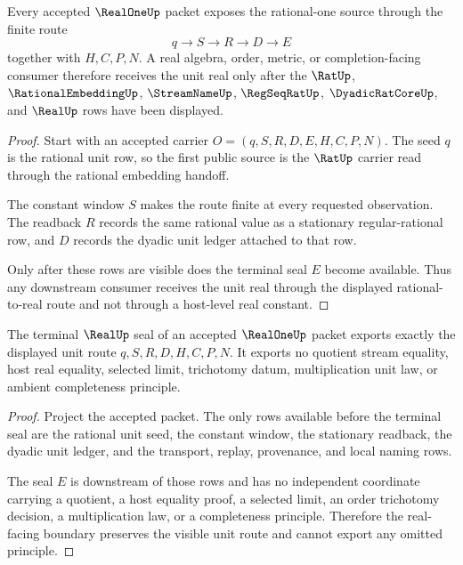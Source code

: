 \begin{theorem}
\label{thm:real-one-rational-embedding-route}
Every accepted $\RealOneUp$ packet exposes the rational-one source through the finite route
$$
q \longrightarrow S \longrightarrow R \longrightarrow D \longrightarrow E
$$
together with $H,C,P,N$. A real algebra, order, metric, or completion-facing consumer therefore receives the unit real only after the $\RatUp$, $\RationalEmbeddingUp$, $\StreamNameUp$, $\RegSeqRatUp$, $\DyadicRatCoreUp$, and $\RealUp$ rows have been displayed.
\end{theorem}
\begin{proof}
Start with an accepted carrier $O=(q,S,R,D,E,H,C,P,N)$. The seed $q$ is the rational unit row, so the first public source is the $\RatUp$ carrier read through the rational embedding handoff.

The constant window $S$ makes the route finite at every requested observation. The readback $R$ records the same rational value as a stationary regular-rational row, and $D$ records the dyadic unit ledger attached to that row.

Only after these rows are visible does the terminal seal $E$ become available. Thus any downstream consumer receives the unit real through the displayed rational-to-real route and not through a host-level real constant.
\end{proof}

\begin{theorem}
\label{thm:real-one-terminal-seal-nonescape}
The terminal $\RealUp$ seal of an accepted $\RealOneUp$ packet exports exactly the displayed unit route $q,S,R,D,H,C,P,N$. It exports no quotient stream equality, host real equality, selected limit, trichotomy datum, multiplication unit law, or ambient completeness principle.
\end{theorem}
\begin{proof}
Project the accepted packet. The only rows available before the terminal seal are the rational unit seed, the constant window, the stationary readback, the dyadic unit ledger, and the transport, replay, provenance, and local naming rows.

The seal $E$ is downstream of those rows and has no independent coordinate carrying a quotient, a host equality proof, a selected limit, an order trichotomy decision, a multiplication law, or a completeness principle. Therefore the real-facing boundary preserves the visible unit route and cannot export any omitted principle.
\end{proof}

